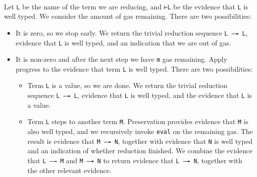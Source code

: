 \begin{fence}
\begin{code}
\AgdaSpace{}%
\AgdaSpace{}%
\AgdaSymbol{(}\AgdaSpace{}%
\AgdaSymbol{)}\AgdaSpace{}%
\AgdaSymbol{(}\AgdaSpace{}%
\AgdaSpace{}%
\AgdaSymbol{)}\<%
\\
\>[0]%
\>[7]\AgdaSymbol{|}\AgdaSpace{}%
\AgdaSpace{}%
\AgdaSpace{}%
%
\>[57]\AgdaSymbol{=}%
\>[60]\AgdaSpace{}%
\AgdaSymbol{(}\AgdaSpace{}%
\AgdaSpace{}%
\AgdaSpace{}%
\AgdaSpace{}%
\AgdaSymbol{)}\AgdaSpace{}%
\<%
\end{code}
\end{fence}

Let \texttt{L} be the name of the term we are reducing, and \texttt{⊢L}
be the evidence that \texttt{L} is well typed. We consider the amount of
gas remaining. There are two possibilities:

\begin{itemize}
\item
  It is zero, so we stop early. We return the trivial reduction sequence
  \texttt{L\ —↠\ L}, evidence that \texttt{L} is well typed, and an
  indication that we are out of gas.
\item
  It is non-zero and after the next step we have \texttt{m} gas
  remaining. Apply progress to the evidence that term \texttt{L} is well
  typed. There are two possibilities:

  \begin{itemize}
  \item
    Term \texttt{L} is a value, so we are done. We return the trivial
    reduction sequence \texttt{L\ —↠\ L}, evidence that \texttt{L} is
    well typed, and the evidence that \texttt{L} is a value.
  \item
    Term \texttt{L} steps to another term \texttt{M}. Preservation
    provides evidence that \texttt{M} is also well typed, and we
    recursively invoke \texttt{eval} on the remaining gas. The result is
    evidence that \texttt{M\ —↠\ N}, together with evidence that
    \texttt{N} is well typed and an indication of whether reduction
    finished. We combine the evidence that \texttt{L\ —→\ M} and
    \texttt{M\ —↠\ N} to return evidence that \texttt{L\ —↠\ N},
    together with the other relevant evidence.
  \end{itemize}
\end{itemize}

